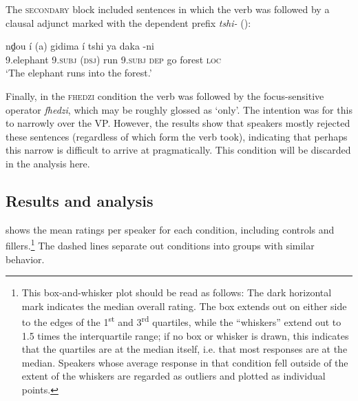 \documentclass[output=paper,modfonts,nonflat,hidelinks]{langsci/langscibook}
\begin{document}
The \textsc{secondary} block included sentences in which the verb was followed
by a clausal adjunct marked with the dependent prefix \textit{tshi-}
(\citealt{Warmelo1989}):


\ea \label{ex:kusmer:secondary}
\gll  nḓou í (a) gidima í tshi ya daka -ni\\
	9.elephant 9.\textsc{subj} (\textsc{dsj}) run 9.\textsc{subj} \textsc{dep}
	go forest \textsc{loc}\\
	\glt  `The elephant runs into the forest.'
 \z


Finally, in the \textsc{fhedzi} condition the verb was followed by the
focus-sensitive operator \textit{fhedzi}, which may be roughly glossed as
`only'. The intention was for this to narrowly  over the VP. However, the
results show that speakers mostly rejected these sentences (regardless of which
form the verb took), indicating that perhaps this narrow  is difficult to
arrive at pragmatically. This condition will be discarded in the
analysis here.


\subsection{Results and analysis}

 shows the mean ratings per speaker for each
condition, including controls and fillers.\footnote{This box-and-whisker plot
	should be read as follows: The dark horizontal mark indicates the median
	overall rating. The box extends out on either side to the edges of the
	1\textsuperscript{st} and 3\textsuperscript{rd} quartiles, while the
	``whiskers'' extend out to 1.5 times the interquartile range; if no box or
	whisker is drawn, this indicates that the quartiles are at the median
itself, i.e.  that most responses are at the median.  Speakers whose
average response in that condition fell  outside of the extent of the whiskers
are regarded as outliers and plotted as individual points.} The dashed lines
separate out conditions into groups with similar behavior.

\end{document}
